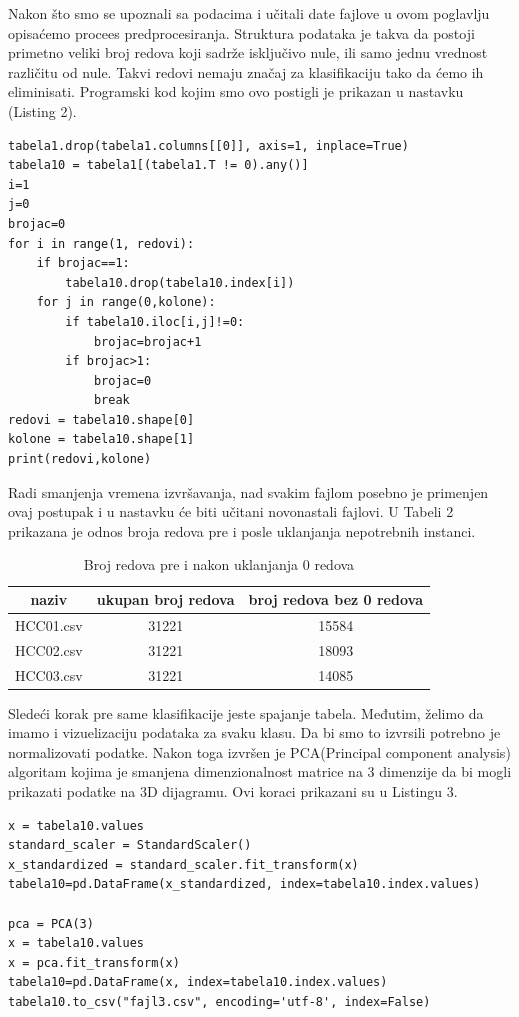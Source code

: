 \documentclass[14pt]{extarticle}
\begin{document}
Nakon što smo se upoznali sa podacima i učitali date fajlove u ovom poglavlju opisaćemo procees predprocesiranja. Struktura podataka je takva da postoji primetno veliki broj redova koji sadrže isključivo nule, ili samo jednu vrednost različitu od nule. Takvi redovi nemaju značaj za klasifikaciju tako da ćemo ih eliminisati. Programski kod kojim smo ovo postigli je prikazan u nastavku (Listing 2).

\begin{lstlisting}[caption={Redukcija redova},frame=single, label=simple]
tabela1.drop(tabela1.columns[[0]], axis=1, inplace=True)
tabela10 = tabela1[(tabela1.T != 0).any()]
i=1
j=0
brojac=0
for i in range(1, redovi):
	if brojac==1:
		tabela10.drop(tabela10.index[i])
	for j in range(0,kolone):
		if tabela10.iloc[i,j]!=0:
			brojac=brojac+1
		if brojac>1:
			brojac=0
			break			
redovi = tabela10.shape[0]  
kolone = tabela10.shape[1]
print(redovi,kolone)  
\end{lstlisting}

Radi smanjenja vremena izvršavanja, nad svakim fajlom posebno je primenjen ovaj postupak i u nastavku će biti učitani novonastali fajlovi. U Tabeli 2 prikazana je odnos broja redova pre i posle uklanjanja nepotrebnih instanci.

\begin{table}[h!]
\begin{center}
\caption{ Broj redova pre i nakon uklanjanja 0 redova}
\begin{tabular}{|c|c|c|} \hline
naziv& ukupan broj redova&  broj redova bez 0 redova\\ \hline
HCC01.csv& 31221 &15584\\ \hline
HCC02.csv&31221&18093\\ \hline
HCC03.csv&31221 &14085\\ \hline\end{tabular}
\label{tab:tabela1}
\end{center}
\end{table}

Sledeći korak pre same klasifikacije jeste spajanje tabela. Međutim, želimo da imamo i vizuelizaciju podataka za svaku klasu. Da bi smo to izvrsili potrebno je normalizovati podatke. Nakon toga izvršen je PCA(Principal component analysis) algoritam kojima je smanjena dimenzionalnost matrice na 3 dimenzije da bi mogli prikazati podatke na 3D dijagramu. Ovi koraci prikazani su u Listingu 3.

\begin{lstlisting}[caption={Normalizacija i PCA},frame=single, label=simple]
x = tabela10.values
standard_scaler = StandardScaler()
x_standardized = standard_scaler.fit_transform(x)
tabela10=pd.DataFrame(x_standardized, index=tabela10.index.values)

pca = PCA(3)
x = tabela10.values
x = pca.fit_transform(x)
tabela10=pd.DataFrame(x, index=tabela10.index.values)
tabela10.to_csv("fajl3.csv", encoding='utf-8', index=False)

\end{lstlisting}
\end{document}

